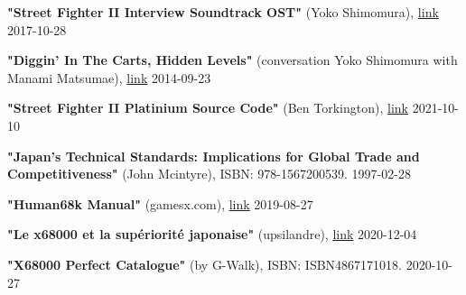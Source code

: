 \begin{thebibliography}{999}
  \textbf{"Street Fighter II Interview Soundtrack OST"} (Yoko Shimomura),
  \href{https://www.youtube.com/watch?v=HOxN8Dzv2sw}{link}
  2017-10-28
  
  \textbf{"Diggin' In The Carts, Hidden Levels"} (conversation Yoko Shimomura with Manami Matsumae),
  \href{https://www.youtube.com/watch?v=Y__usQbGA5M}{link}
  2014-09-23

  \textbf{"Street Fighter II Platinium Source Code"} (Ben Torkington),
  \href{https://github.com/bentorkington/sf2ww}{link}
  2021-10-10

  \textbf{"Japan's Technical Standards: Implications for Global Trade and Competitiveness"} (John Mcintyre),
  ISBN: 978-1567200539.
  1997-02-28

  \textbf{"Human68k Manual"} (gamesx.com),
\href{https://gamesx.com/wiki/doku.php?id=x68000:human68k_manual}{link}
  2019-08-27

  \textbf{"Le x68000 et la supériorité japonaise"} (upsilandre),
\href{https://www.gamopat-forum.com/t38282p210-le-x68000-et-la-superiorite-japonaise#3336620}{link}
  2020-12-04

  \textbf{"X68000 Perfect Catalogue"} (by G-Walk),
ISBN: ISBN4867171018.
  2020-10-27

\end{thebibliography}